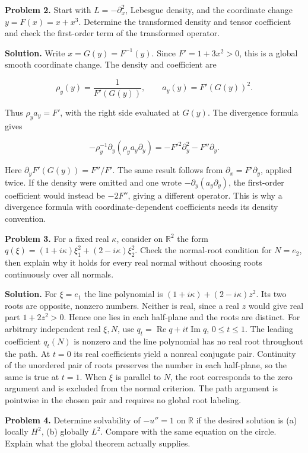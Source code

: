 \documentclass[
  11pt,
]{article}
\begin{document}
\textbf{Problem 2.} Start with \(L=-\partial_x^2\), Lebesgue density,
and the coordinate change \(y=F(x)=x+x^3\). Determine the transformed
density and tensor coefficient and check the first-order term of the
transformed operator.

\textbf{Solution.} Write \(x=G(y)=F^{-1}(y)\). Since \(F'=1+3x^2>0\),
this is a global smooth coordinate change. The density and coefficient
are

\[
 \rho_y(y)=\frac1{F'(G(y))},\qquad
 a_y(y)=F'(G(y))^2.                                             \tag{D41}
\]

Thus \(\rho_y a_y=F'\), with the right side evaluated at \(G(y)\). The
divergence formula gives

\[
 -\rho_y^{-1}\partial_y(\rho_y a_y\partial_y)
           =-F'^2\partial_y^2-F''\partial_y.                    \tag{D42}
\]

Here \(\partial_y F'(G(y))=F''/F'\). The same result follows from
\(\partial_x=F'\partial_y\), applied twice. If the density were omitted
and one wrote \(-\partial_y(a_y\partial_y)\), the first-order
coefficient would instead be \(-2F''\), giving a different operator.
This is why a divergence formula with coordinate-dependent coefficients
needs its density convention.

\textbf{Problem 3.} For a fixed real \(\kappa\), consider on
\(\mathbb R^2\) the form
\(q(\xi)=(1+i\kappa)\xi_1^2+(2-i\kappa)\xi_2^2\). Check the normal-root
condition for \(N=e_2\), then explain why it holds for every real normal
without choosing roots continuously over all normals.

\textbf{Solution.} For \(\xi=e_1\) the line polynomial is
\((1+i\kappa)+(2-i\kappa)z^2\). Its two roots are opposite, nonzero
numbers. Neither is real, since a real \(z\) would give real part
\(1+2z^2>0\). Hence one lies in each half-plane and the roots are
distinct. For arbitrary independent real \(\xi,N\), use
\(q_t=\operatorname{Re}q+it\operatorname{Im}q\), \(0\leq t\leq1\). The
leading coefficient \(q_t(N)\) is nonzero and the line polynomial has no
real root throughout the path. At \(t=0\) its real coefficients yield a
nonreal conjugate pair. Continuity of the unordered pair of roots
preserves the number in each half-plane, so the same is true at \(t=1\).
When \(\xi\) is parallel to \(N\), the root corresponds to the zero
argument and is excluded from the normal criterion. The path argument is
pointwise in the chosen pair and requires no global root labeling.

\textbf{Problem 4.} Determine solvability of \(-u''=1\) on \(\mathbb R\)
if the desired solution is (a) locally \(H^2\), (b) globally \(L^2\).
Compare with the same equation on the circle. Explain what the global
theorem actually supplies.
\end{document}
